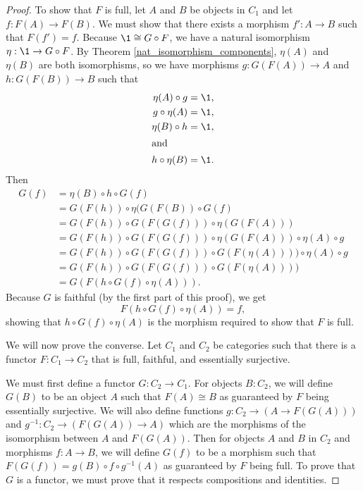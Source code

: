 \documentclass[../../math.tex]{subfiles}
\begin{document}
\begin{proof}
    To show that $F$ is full, let $A$ and $B$ be objects in $C_1$ and let $f :
    F(A) \to F(B)$.  We must show that there exists a morphism $f' : A \to B$
    such that $F(f') = f$.  Because $\1 \cong G \circ F$, we have a natural
    isomorphism $\eta : \1 \to G \circ F$.  By Theorem
    \ref{nat_isomorphism_components}, $\eta(A)$ and $\eta(B)$ are both
    isomorphisms, so we have morphisms $g : G(F(A)) \to A$ and $h : G(F(B)) \to
    B$ such that
    \begin{align*}
        \eta(A) \circ g &= \1, \\
        g \circ \eta(A) &= \1, \\
        \eta(B) \circ h &= \1, \\
        \intertext{and}
        h \circ \eta(B) &= \1. \\
    \end{align*}
    Then
    \begin{align*}
        G(f) &= \eta(B) \circ h \circ G(f) \\
        &= G(F(h)) \circ \eta(G(F(B)) \circ G(f) \\
        &= G(F(h)) \circ G(F(G(f))) \circ \eta(G(F(A))) \\
        &= G(F(h)) \circ G(F(G(f))) \circ \eta(G(F(A))) \circ \eta(A) \circ g \\
        &= G(F(h)) \circ G(F(G(f))) \circ G(F(\eta(A)))) \circ \eta(A) \circ g \\
        &= G(F(h)) \circ G(F(G(f))) \circ G(F(\eta(A)))) \\
        &= G(F(h \circ G(f) \circ \eta(A))).
    \end{align*}
    Because $G$ is faithful (by the first part of this proof), we get
    \[
        F(h \circ G(f) \circ \eta(A)) = f,
    \]
    showing that $h \circ G(f) \circ \eta(A)$ is the morphism required to show
    that $F$ is full.

    We will now prove the converse.  Let $C_1$ and $C_2$ be categories such that
    there is a functor $F : C_1 \to C_2$ that is full, faithful, and essentially
    surjective.

    We must first define a functor $G : C_2 \to C_1$.  For objects $B : C_2$, we
    will define $G(B)$ to be an object $A$ such that $F(A) \cong B$ as
    guaranteed by $F$ being essentially surjective.  We will also define
    functions $g : C_2 \to (A \to F(G(A)))$ and $g^{-1} : C_2 \to (F(G(A)) \to
    A)$ which are the morphisms of the isomorphism between $A$ and $F(G(A))$.
    Then for objects $A$ and $B$ in $C_2$ and morphisms $f : A \to B$, we will
    define $G(f)$ to be a morphism such that $F(G(f)) = g(B) \circ f \circ
    g^{-1}(A)$ as guaranteed by $F$ being full.  To prove that $G$ is a functor,
    we must prove that it respects compositions and identities.


\end{proof}
\end{document}
